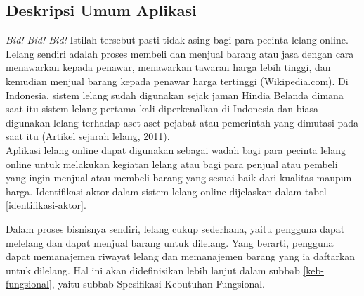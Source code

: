 \subsection{Deskripsi Umum Aplikasi}
	\label{deskripsi-umum-app}

	\textit{Bid! Bid! Bid!} Istilah tersebut pasti tidak asing bagi para pecinta lelang online. Lelang sendiri adalah proses membeli dan menjual barang atau jasa dengan cara menawarkan kepada penawar, menawarkan tawaran harga lebih tinggi, dan kemudian menjual barang kepada penawar harga tertinggi (Wikipedia.com).  Di Indonesia, sistem lelang sudah digunakan sejak jaman Hindia Belanda dimana saat itu sistem lelang pertama kali diperkenalkan di Indonesia dan biasa digunakan lelang terhadap aset-aset pejabat atau pemerintah yang dimutasi pada saat itu (Artikel sejarah lelang, 2011). \\
	\indent Aplikasi lelang online dapat digunakan sebagai wadah bagi para pecinta lelang online untuk melakukan kegiatan lelang atau bagi para penjual atau pembeli yang ingin menjual atau membeli barang yang sesuai baik dari kualitas maupun harga. Identifikasi aktor dalam sistem lelang online dijelaskan dalam tabel \ref{identifikasi-aktor}.
	
	 
	
	\indent Dalam proses bisnisnya sendiri, lelang cukup sederhana, yaitu pengguna dapat melelang dan dapat menjual barang untuk dilelang. Yang berarti, pengguna dapat memanajemen riwayat lelang dan memanajemen barang yang ia daftarkan untuk dilelang. Hal ini akan didefinisikan lebih lanjut dalam subbab \ref{keb-fungsional}, yaitu subbab Spesifikasi Kebutuhan Fungsional.
